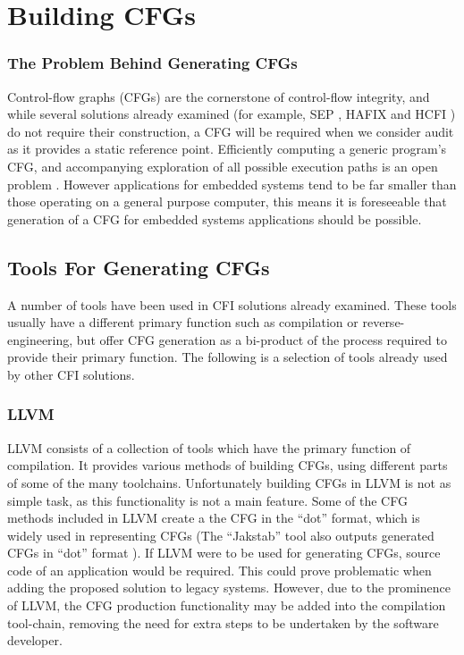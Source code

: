 \section{Building CFGs}

\subsubsection*{The Problem Behind Generating CFGs}

Control-flow graphs (CFGs) are the cornerstone of control-flow integrity, and while several solutions already examined (for example, SEP \cite{Lee2019}, HAFIX \cite{Davi2015} and HCFI \cite{Danger2018}) do not require their construction, a CFG will be required when we consider audit as it provides a static reference point. Efficiently computing a generic program's CFG, and accompanying exploration of all possible execution paths is an open problem \cite{Abera2016}. However applications for embedded systems tend to be far smaller than those operating on a general purpose computer, this means it is foreseeable that generation of a CFG for embedded systems applications should be possible.

\subsection{Tools For Generating CFGs}

A number of tools have been used in CFI solutions already examined. These tools usually have a different primary function such as compilation or reverse-engineering, but offer CFG generation as a bi-product of the process required to provide their primary function. The following is a selection of tools already used by other CFI solutions.

\subsubsection*{LLVM}

LLVM \cite{LLVM:CGO04} consists of a collection of tools which have the primary function of compilation. It provides various methods of building CFGs, using different parts of some of the many toolchains. Unfortunately building CFGs in LLVM is not as simple task, as this functionality is not a main feature. Some of the CFG methods included in LLVM create a the CFG in the ``dot'' format, which is widely used in representing CFGs (The ``Jakstab'' tool also outputs generated CFGs in ``dot'' format \cite{Kinder2008}). If LLVM were to be used for generating CFGs, source code of an application would be required. This could prove problematic when adding the proposed solution to legacy systems. However, due to the prominence of LLVM, the CFG production functionality may be added into the compilation tool-chain, removing the need for extra steps to be undertaken by the software developer.

